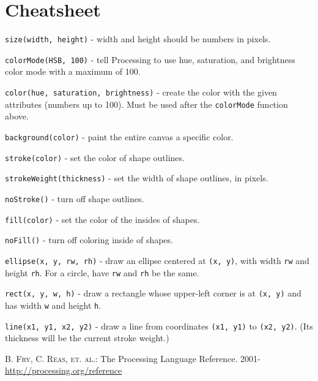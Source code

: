 \documentclass[
]{leaflet}
\begin{document}
\section{Cheatsheet}

\texttt{size(width, height)} - width and height should be numbers in pixels.

\texttt{colorMode(HSB, 100)} - tell Processing to use hue, saturation, and brightness color mode with a maximum of 100.

\texttt{color(hue, saturation, brightness)} - create the color with the given attributes (numbers up to 100).
Must be used after the \texttt{colorMode} function above.

\texttt{background(color)} - paint the entire canvas a specific color.

\texttt{stroke(color)} - set the color of shape outlines.

\texttt{strokeWeight(thickness)} - set the width of shape outlines, in pixels.

\texttt{noStroke()} - turn off shape outlines.

\texttt{fill(color)} - set the color of the insides of shapes.

\texttt{noFill()} - turn off coloring inside of shapes.

\texttt{ellipse(x, y, rw, rh)} - draw an ellipse centered at \texttt{(x, y)}, with width \texttt{rw} and height \texttt{rh}.
For a circle, have \texttt{rw} and \texttt{rh} be the same.

\texttt{rect(x, y, w, h)} - draw a rectangle whose upper-left corner is at \texttt{(x, y)} and has width \texttt{w} and height \texttt{h}.

\texttt{line(x1, y1, x2, y2)} - draw a line from coordinates \texttt{(x1, y1)} to \texttt{(x2, y2)}.
(Its thickness will be the current stroke weight.)


\begin{thebibliography}{000}
  \textsc{B. Fry, C. Reas, et. al.}: The Processing Language Reference. 2001-\\
  \url{http://processing.org/reference}
\end{thebibliography}

\loggingall
\end{document}
